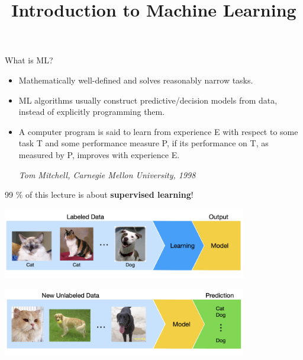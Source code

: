 \documentclass[11pt,compress,t,notes=noshow, xcolor=table]{beamer}
\title{Introduction to Machine Learning}
\date{}
\begin{document}
\sloppy


\begin{vbframe}{What is ML?}
\begin{itemize}
 \item \small Mathematically well-defined and solves reasonably narrow tasks.
    \item \small ML algorithms usually construct predictive/decision models from data, instead of explicitly programming them.
    \item A computer program is said to learn from experience E with respect to
  some task T and some performance measure P, if its performance on T, as 
  measured by P, improves with experience E. \\
  \begin{footnotesize}
  \emph{Tom Mitchell, Carnegie Mellon University, 1998}
  \end{footnotesize}
\end{itemize}

\small 99 $\%$ of this lecture is about \textbf{supervised learning}! 

\begin{center}
  \includegraphics[width = 0.8\textwidth]{figure_man/CatDog_Learning_example.png} 
\end{center}
\begin{center}
  \includegraphics[width = 0.8\textwidth]{figure_man/CatDog_Prediction_example.png} 
\end{center}

\end{vbframe}
\end{document}
